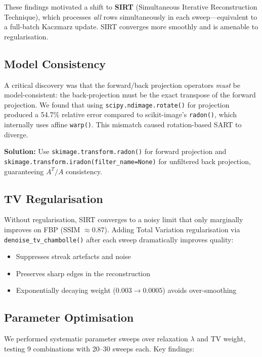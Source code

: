 \documentclass[11pt,a4paper]{article}
\begin{document}
These findings motivated a shift to \textbf{SIRT} (Simultaneous Iterative Reconstruction Technique), which processes \emph{all} rows simultaneously in each sweep---equivalent to a full-batch Kaczmarz update.  SIRT converges more smoothly and is amenable to regularisation.

\subsection{Model Consistency}

A critical discovery was that the forward/back projection operators \emph{must} be model-consistent: the back-projection must be the exact transpose of the forward projection.  We found that using \texttt{scipy.ndimage.rotate()} for projection produced a 54.7\% relative error compared to scikit-image's \texttt{radon()}, which internally uses affine \texttt{warp()}.  This mismatch caused rotation-based SART to diverge.

\textbf{Solution:} Use \texttt{skimage.transform.radon()} for forward projection and \texttt{skimage.transform.iradon(filter\_name=None)} for unfiltered back projection, guaranteeing $A^T / A$ consistency.

\subsection{TV Regularisation}

Without regularisation, SIRT converges to a noisy limit that only marginally improves on FBP (SSIM $\approx 0.87$).  Adding Total Variation regularisation via \texttt{denoise\_tv\_chambolle()} after each sweep dramatically improves quality:

\begin{itemize}
    \item Suppresses streak artefacts and noise
    \item Preserves sharp edges in the reconstruction
    \item Exponentially decaying weight ($0.003 \to 0.0005$) avoids over-smoothing
\end{itemize}

\subsection{Parameter Optimisation}

We performed systematic parameter sweeps over relaxation $\lambda$ and TV weight, testing 9 combinations with 20--30 sweeps each.  Key findings:
\end{document}
